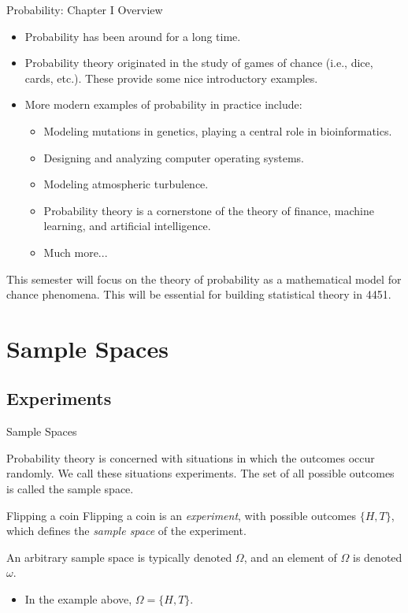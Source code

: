 \begin{frame}{Probability: Chapter I Overview}

\begin{itemize}

\item Probability has been around for a long time.
\item Probability theory originated in the study of games of chance (i.e., dice, cards, etc.). These provide some nice introductory examples. 
\item More modern examples of probability in practice include: 
\begin{itemize}
  \item Modeling mutations in genetics, playing a central role in bioinformatics.
  \item Designing and analyzing computer operating systems.
  \item Modeling atmospheric turbulence. 
  \item Probability theory is a cornerstone of the theory of finance, machine learning, and artificial intelligence.
  \item Much more...
\end{itemize}
\end{itemize}

This semester will focus on the theory of probability as a mathematical model for chance phenomena. This will be essential for building statistical theory in 4451.

\end{frame}

\section{Sample Spaces}

\subsection{Experiments}

\begin{frame}{Sample Spaces}

Probability theory is concerned with situations in which the outcomes occur randomly.
We call these situations \alert{experiments}. 
The set of all possible outcomes is called the \alert{sample space}. 

\begin{exampleblock}{Flipping a coin}
  Flipping a coin is an \emph{experiment}, with possible outcomes $\{H, T\}$, which defines the \emph{sample space} of the experiment.
\end{exampleblock}

An arbitrary sample space is typically denoted $\Omega$, and an element of $\Omega$ is denoted $\omega$.

\pause 

\begin{itemize}
  \item In the example above, $\Omega = \{H, T\}$. 
\end{itemize}

\end{frame}

